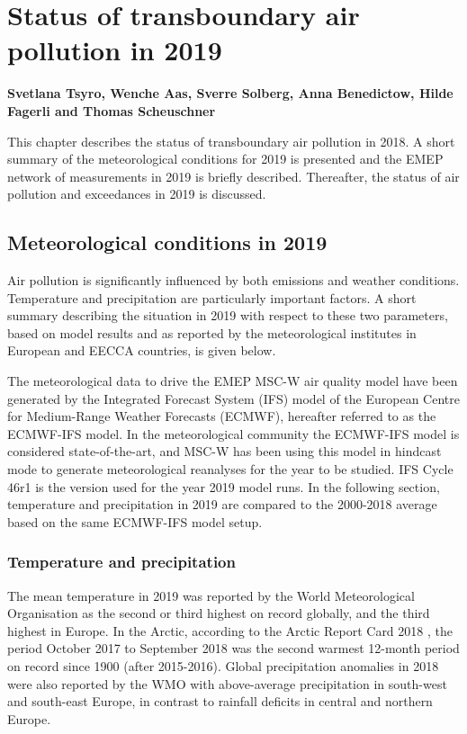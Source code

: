 \chapter[Status in 2019]{Status of transboundary air pollution in 2019}
\label{ch:chapterStatus}


{\bf{Svetlana Tsyro, Wenche Aas, Sverre Solberg, Anna Benedictow, Hilde Fagerli and Thomas Scheuschner}}
\vspace{30pt}

This chapter describes the status of transboundary air pollution in 2018. A short summary of the meteorological conditions for 2019 is presented and the EMEP network of measurements in 2019 is briefly described. Thereafter, the status of air pollution and exceedances in 2019 is discussed.

\section{Meteorological conditions in 2019}
\label{sec:meteo}
Air pollution is significantly influenced by both emissions and weather conditions. Temperature and precipitation are particularly important factors. A short summary describing the situation in 2019 with respect to these two parameters, based on model results and as reported by the meteorological institutes in European and EECCA countries, is given below.

The meteorological data to drive the EMEP MSC-W air quality model have been generated by the Integrated Forecast System (IFS) model of the European Centre for Medium-Range Weather Forecasts (ECMWF), hereafter referred to as the ECMWF-IFS model. In the meteorological community the ECMWF-IFS model is considered state-of-the-art, and MSC-W has been using this model in hindcast mode to generate meteorological reanalyses for the year to be studied. IFS Cycle 46r1 is the version used for the year 2019 model runs. In the following section, temperature and precipitation in 2019 are compared to the 2000-2018 average based on the same ECMWF-IFS model setup.

\subsection{Temperature and precipitation}
The mean temperature in 2019 was reported by the World Meteorological Organisation \citep{WMO1233:2019} as the second or third highest on record globally, and the third highest in Europe. In the Arctic, according to the Arctic Report Card 2018 \citep{Overland:ARC2018}, the period October 2017 to September 2018 was the second warmest 12-month period on record since 1900 (after 2015-2016).
Global precipitation anomalies in 2018 were also reported by the WMO \citep{WMO1233:2018} with above-average precipitation in south-west and south-east Europe, in contrast to rainfall deficits in central and northern Europe. 

